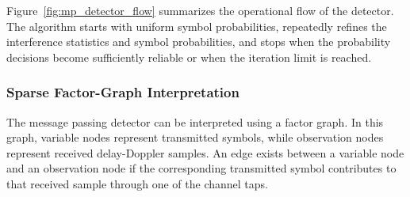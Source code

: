 Figure~\ref{fig:mp_detector_flow} summarizes the operational flow of the detector. The algorithm starts with uniform symbol probabilities, repeatedly refines the interference statistics and symbol probabilities, and stops when the probability decisions become sufficiently reliable or when the iteration limit is reached.

\subsubsection{Sparse Factor-Graph Interpretation}

The message passing detector can be interpreted using a factor graph. In this graph, variable nodes represent transmitted symbols, while observation nodes represent received delay-Doppler samples. An edge exists between a variable node and an observation node if the corresponding transmitted symbol contributes to that received sample through one of the channel taps.

